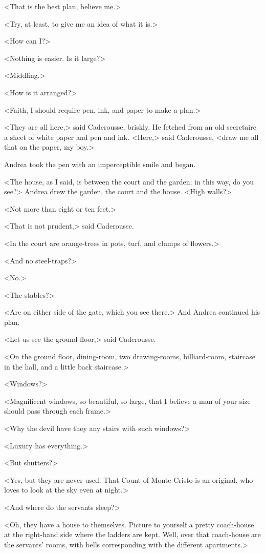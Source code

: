  <That is the best plan, believe me.> 

 <Try, at least, to give me an idea of what it is.> 

 <How can I?> 

 <Nothing is easier. Is it large?> 

 <Middling.> 

 <How is it arranged?> 

 <Faith, I should require pen, ink, and paper to make a plan.> 

 <They are all here,> said Caderousse, briskly. He fetched from an old secretaire a sheet of white paper and pen and ink. <Here,> said Caderousse, <draw me all that on the paper, my boy.> 

 Andrea took the pen with an imperceptible smile and began. 

 <The house, as I said, is between the court and the garden; in this way, do you see?> Andrea drew the garden, the court and the house.  <High walls?> 

 <Not more than eight or ten feet.> 

 <That is not prudent,> said Caderousse. 

 <In the court are orange-trees in pots, turf, and clumps of flowers.> 

 <And no steel-traps?> 

 <No.> 

 <The stables?> 

 <Are on either side of the gate, which you see there.> And Andrea continued his plan. 

 <Let us see the ground floor,> said Caderousse. 

 <On the ground floor, dining-room, two drawing-rooms, billiard-room, staircase in the hall, and a little back staircase.> 

 <Windows?> 

 <Magnificent windows, so beautiful, so large, that I believe a man of your size should pass through each frame.> 

 <Why the devil have they any stairs with such windows?> 

 <Luxury has everything.> 

 <But shutters?> 

 <Yes, but they are never used. That Count of Monte Cristo is an original, who loves to look at the sky even at night.> 

 <And where do the servants sleep?> 

 <Oh, they have a house to themselves. Picture to yourself a pretty coach-house at the right-hand side where the ladders are kept. Well, over that coach-house are the servants' rooms, with bells corresponding with the different apartments.> 

